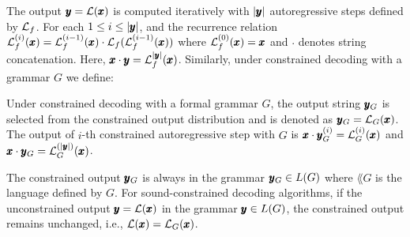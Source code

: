 The output $\vect{y} = \llm{}(\vect{x})$ is computed iteratively with $|\vect{y}|$ autoregressive steps defined by $\llmFormal$. For each $1 \leq i \leq |\vect{y}|$, and the recurrence relation $\llmFormal^{(i)}(\vect{x}) = \llmFormal^{(i-1)}(\vect{x}) \cdot \llmFormal(\llmFormal^{(i-1)}(\vect{x}))$ where $\llmFormal^{(0)}(\vect{x}) = \vect{x}$ and $\cdot $ denotes string concatenation. Here, $\vect{x} \cdot \vect{y} = \llmFormal^{|\vect{y}|}(\vect{x})$. Similarly, under constrained decoding with a grammar $G$ we define:
\begin{definition}
Under constrained decoding with a formal grammar $G$, the output string $\vect{y}_{G}$ is selected from the constrained output distribution and is denoted as $\vect{y}_{G} = \llmG{\vect{x}}{G}$. The output of $i$-th constrained autoregressive step with $G$ is $\vect{x}\cdot\vect{y}^{(i)}_G = \llmFormalG{i}{\vect{x}}{G}$ and $\vect{x}\cdot\vect{y}_G = \llmFormalG{|\vect{y}|}{\vect{x}}{G}$. 
\end{definition}
The constrained output $\vect{y}_G$ is always in the grammar $\vect{y}_G \in \lang{G}$ where $\lang{G}$ is the language defined by $G$. For sound-constrained decoding algorithms, if the unconstrained output $\vect{y} = \llm(\vect{x})$ in the grammar $\vect{y} \in \lang{G}$, the constrained output remains unchanged, i.e., $\llm(\vect{x}) = \llmG{\vect{x}}{G}$.



